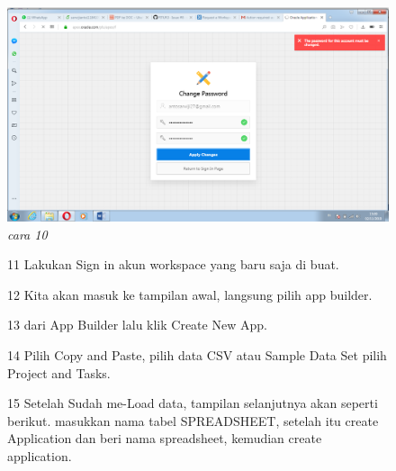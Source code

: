 \begin{enumerate}
\begin{figure}
    \begin{center}
\includegraphics[scale=0.2]{apex/db8.png}
    \caption{\textit{cara 10}}
        \end{center}
\label{gambar}
\end{figure}

\begin{figure}
\item[11] Lakukan Sign in akun workspace yang baru saja di buat.

\end{figure}

\begin{figure}
\item[12] Kita akan masuk ke tampilan awal, langsung pilih app builder.

    
\end{figure}

\begin{figure}
\item[13] dari App Builder lalu klik Create New App.

\end{figure}

\begin{figure}
\item[14] Pilih Copy and Paste, pilih data CSV atau Sample Data Set pilih Project and Tasks.

\end{figure}

\begin{figure}
\item[15] Setelah Sudah me-Load data, tampilan selanjutnya akan seperti berikut. masukkan nama tabel {SPREADSHEET}, setelah itu create Application dan beri nama spreadsheet, kemudian create application.
\
\end{figure}


\end{enumerate}
